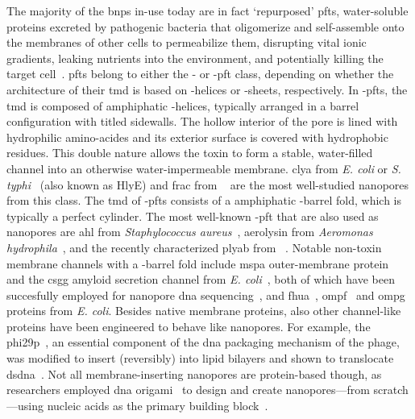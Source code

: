 The majority of the \glspl{bnp} in-use today are in fact `repurposed' \glspl{pft}, water-soluble proteins
excreted by pathogenic bacteria that oligomerize and self-assemble onto the membranes of other cells to
permeabilize them, disrupting vital ionic gradients, leaking nutrients into the environment, and potentially
killing the target cell~\cite{Peraro-2015}. \Glspl{pft} belong to either the \ta- or \tb-\gls{pft} class,
depending on whether the architecture of their \gls{tmd} is based on \ta-helices or \tb-sheets, respectively.
In \ta-\glspl{pft}, the \gls{tmd} is composed of amphiphatic \ta-helices, typically arranged in a barrel
configuration with titled sidewalls. The hollow interior of the pore is lined with hydrophilic amino-acides
and its exterior surface is covered with hydrophobic residues. This double nature allows the toxin to form a
stable, water-filled channel into an otherwise water-impermeable membrane. \Gls{clya} from \textit{E. coli} or
\textit{S. typhi}~\cite{Mueller-2009} (also known as HlyE) and \gls{frac} from ~\cite{Tanaka-2015} are the most well-studied nanopores from this class. The \gls{tmd} of
\tb-\glspl{pft} consists of a amphiphatic \tb-barrel fold, which is typically a perfect cylinder. The most
well-known \tb-\gls{pft} that are also used as nanopores are \gls{ahl} from \textit{Staphylococcus
aureus}~\cite{Song-1996}, aerolysin from \textit{Aeromonas hydrophila}~\cite{Iacovache-2016}, and the recently
characterized \gls{plyab} from \textit{}~\cite{Lukoyanova-Kondos-2015}. Notable non-toxin membrane channels
with a \tb-barrel fold include \gls{mspa} outer-membrane protein~\cite{Faller-2004} and the \gls{csgg} amyloid
secretion channel from \textit{E. coli}~\cite{Goyal-2014}, both of which have been succesfully employed for
nanopore \gls{dna} sequencing~\cite{Manrao-2012,Brown-2016}, and \gls{fhua}~\cite{Locher-1998},
\gls{ompf}~\cite{Yamashita-2008} and \gls{ompg}~\cite{Subbarao-2006} proteins from \textit{E. coli}. Besides
native membrane proteins, also other channel-like proteins have been engineered to behave like nanopores. For
example, the \gls{phi29p}~\cite{Xu-2019}, an essential component of the \gls{dna} packaging mechanism of the
 phage, was modified to insert (reversibly) into lipid bilayers and shown to translocate
\gls{dsdna}~\cite{Wendell-2009}. Not all membrane-inserting nanopores are protein-based though, as researchers
employed \gls{dna} origami~\cite{Rothemund-2006} to design and create nanopores---from scratch---using nucleic
acids as the primary building
block~\cite{Bell-2011,Langecker-2012,Burns-2013,Bell-2014,Gopfrich-2016,Gopfrich-2019}.


